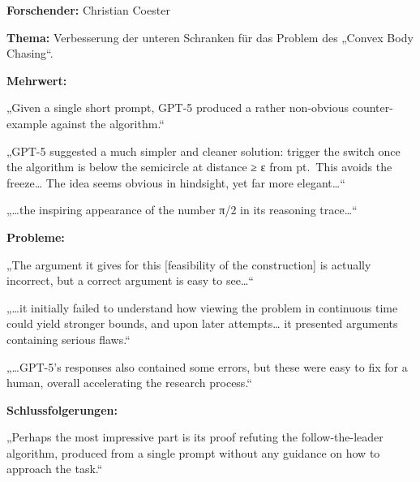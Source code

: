 \documentclass[
  ngerman,
  letterpaper,
  DIV=11]{scrreprt}
\begin{document}
\begin{tcolorbox}[enhanced jigsaw, left=2mm, bottomrule=.15mm, arc=.35mm, rightrule=.15mm, colframe=quarto-callout-note-color-frame, coltitle=black, colback=white, toprule=.15mm, toptitle=1mm, colbacktitle=quarto-callout-note-color!10!white, title=\textcolor{quarto-callout-note-color}{\faInfo}\hspace{0.5em}{Informatik / Schranken für Online-Algorithmen}, opacitybacktitle=0.6, leftrule=.75mm, bottomtitle=1mm, titlerule=0mm, opacityback=0, breakable]

\textbf{Forschender:} Christian Coester

\textbf{Thema:} Verbesserung der unteren Schranken für das Problem des
„Convex Body Chasing``.

\textbf{Mehrwert:}

„Given a single short prompt, GPT-5 produced a rather non-obvious
counter-example against the algorithm.``

„GPT-5 suggested a much simpler and cleaner solution: trigger the switch
once the algorithm is below the semicircle at distance ≥ ε from pt.~This
avoids the freeze\ldots{} The idea seems obvious in hindsight, yet far
more elegant\ldots``

„\ldots the inspiring appearance of the number π/2 in its reasoning
trace\ldots``

\textbf{Probleme:}

„The argument it gives for this {[}feasibility of the construction{]} is
actually incorrect, but a correct argument is easy to see\ldots``

„\ldots it initially failed to understand how viewing the problem in
continuous time could yield stronger bounds, and upon later
attempts\ldots{} it presented arguments containing serious flaws.``

„\ldots GPT-5's responses also contained some errors, but these were
easy to fix for a human, overall accelerating the research process.``

\textbf{Schlussfolgerungen:}

„Perhaps the most impressive part is its proof refuting the
follow-the-leader algorithm, produced from a single prompt without any
guidance on how to approach the task.``

\end{tcolorbox}
\end{document}
